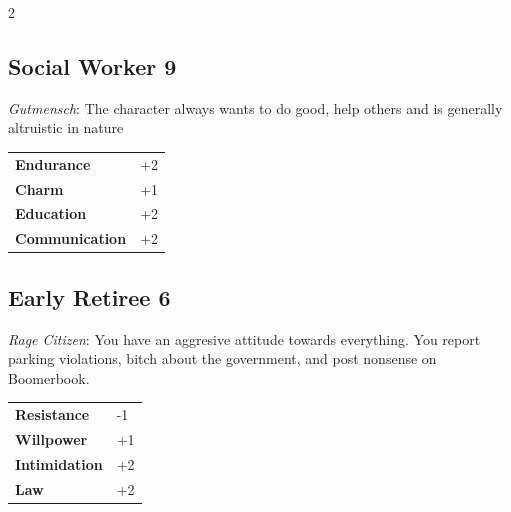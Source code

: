 \begin{multicols}{2}
\begin{tcolorbox}
    \subsection*{Social Worker \hfill \small{9 }}
    \tcblower
\textit{Gutmensch}: The character  always wants to do good, help others and is generally altruistic in nature


\vspace{3mm}

\begin{tabular}{@{}ll@{}}
    \textbf{Endurance} & +2\\
    \textbf{Charm} & +1\\
    \textbf{Education} & +2\\
    \textbf{Communication} & +2\\
\end{tabular}


\end{tcolorbox}

\begin{tcolorbox}
    \subsection*{Early Retiree \hfill \small{6 }}
    \tcblower
\textit{Rage Citizen}: You have an aggresive attitude towards everything. You report parking violations, bitch about the government, and post nonsense on Boomerbook.


\vspace{3mm}

\begin{tabular}{@{}ll@{}}
    \textbf{Resistance} & -1\\
    \textbf{Willpower} & +1\\
    \textbf{Intimidation} & +2\\
    \textbf{Law} & +2\\
\end{tabular}


\end{tcolorbox}


\end{multicols}
